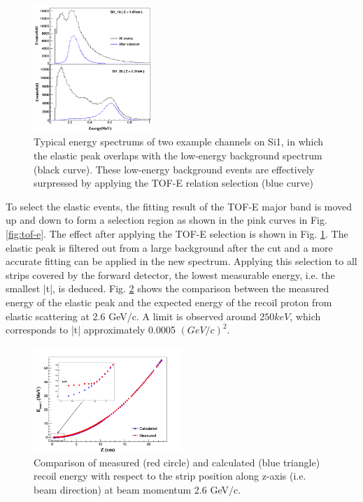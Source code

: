 \documentclass[number,5p]{elsarticle}
\begin{document}
\begin{figure}[htbp]
  \centering
  \includegraphics[width=0.4\textwidth]{./comparison_tof_e_cut.png}
  \caption{Typical energy spectrums of two example channels on Si1, in which the elastic peak overlaps with the low-energy background spectrum (black curve). These low-energy background events are effectively surpressed by applying the TOF-E relation selection (blue curve)}
  \label{fig:cut}
\end{figure}

To select the elastic events, the fitting result of the TOF-E major band is moved up and down to form a selection region as shown in the pink curves in Fig. \ref{fig:tof-e}.
The effect after applying the TOF-E selection is shown in Fig. \ref{fig:cut}.
The elastic peak is filtered out from a large background after the cut and a more accurate fitting can be applied in the new spectrum.
Applying this selection to all strips covered by the forward detector, the lowest measurable energy, i.e. the smallest |t|, is deduced.
Fig. \ref{fig:measured_vs_calculated} shows the comparison between the measured
energy of the elastic peak and the expected energy of the recoil proton from elastic scattering at 2.6 GeV/c.
A limit is observed around \(250 keV\), which corresponds to |t| approximately 0.0005 \((GeV/c)^2\).

\begin{figure}[htbp]
  \centering
  \includegraphics[width=0.5\textwidth]{./calc_vs_measured_combined.png}
  \caption{
    Comparison of measured (red circle) and calculated (blue triangle) recoil energy with respect to the strip position along z-axis (i.e. beam direction) at beam momentum 2.6 GeV/c.}
  \label{fig:measured_vs_calculated}
\end{figure}
\end{document}
